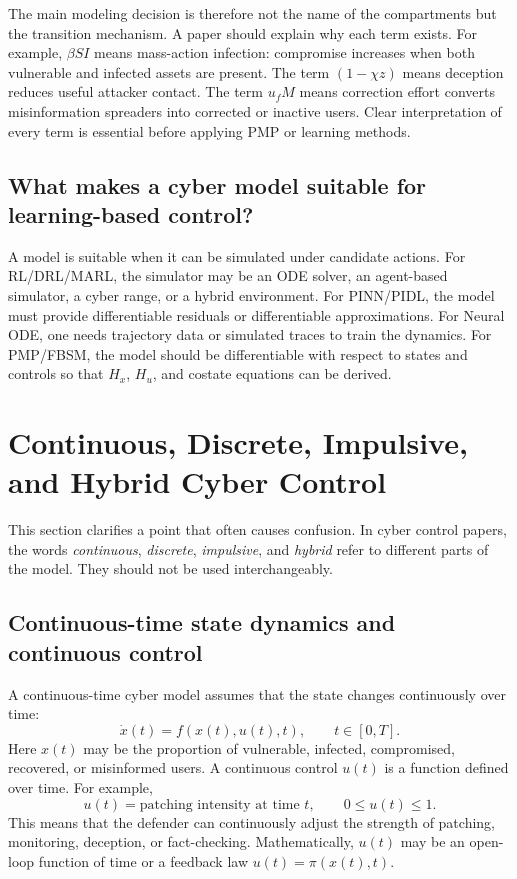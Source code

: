 \documentclass[11pt,a4paper]{article}
\begin{document}
The main modeling decision is therefore not the name of the compartments but the transition mechanism. A paper should explain why each term exists. For example, $\beta SI$ means mass-action infection: compromise increases when both vulnerable and infected assets are present. The term $(1-\chi z)$ means deception reduces useful attacker contact. The term $u_fM$ means correction effort converts misinformation spreaders into corrected or inactive users. Clear interpretation of every term is essential before applying PMP or learning methods.

\subsection{What makes a cyber model suitable for learning-based control?}
A model is suitable when it can be simulated under candidate actions. For RL/DRL/MARL, the simulator may be an ODE solver, an agent-based simulator, a cyber range, or a hybrid environment. For PINN/PIDL, the model must provide differentiable residuals or differentiable approximations. For Neural ODE, one needs trajectory data or simulated traces to train the dynamics. For PMP/FBSM, the model should be differentiable with respect to states and controls so that $H_x$, $H_u$, and costate equations can be derived.


\section{Continuous, Discrete, Impulsive, and Hybrid Cyber Control}\label{sec:continuous-discrete-impulse}

This section clarifies a point that often causes confusion. In cyber control papers, the words \emph{continuous}, \emph{discrete}, \emph{impulsive}, and \emph{hybrid} refer to different parts of the model. They should not be used interchangeably.

\subsection{Continuous-time state dynamics and continuous control}
A continuous-time cyber model assumes that the state changes continuously over time:
\begin{equation}
    \dot{x}(t)=f(x(t),u(t),t),\qquad t\in[0,T].
\end{equation}
Here $x(t)$ may be the proportion of vulnerable, infected, compromised, recovered, or misinformed users. A continuous control $u(t)$ is a function defined over time. For example,
\begin{equation}
    u(t)=\text{patching intensity at time }t,\qquad 0\leq u(t)\leq 1.
\end{equation}
This means that the defender can continuously adjust the strength of patching, monitoring, deception, or fact-checking. Mathematically, $u(t)$ may be an open-loop function of time or a feedback law $u(t)=\pi(x(t),t)$.
\end{document}
